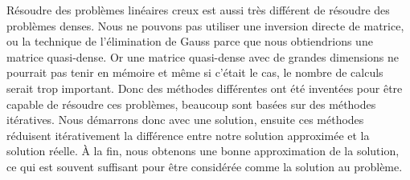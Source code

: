 Résoudre des problèmes linéaires creux est aussi très différent de résoudre des problèmes denses.
%
Nous ne pouvons pas utiliser une inversion directe de matrice, ou la technique de l'élimination de Gauss parce que nous obtiendrions une matrice quasi-dense.
%
Or une matrice quasi-dense avec de grandes dimensions ne pourrait pas tenir en mémoire et même si c'était le cas, le nombre de calculs serait trop important.
%
Donc des méthodes différentes ont été inventées pour être capable de résoudre ces problèmes, beaucoup sont basées sur des méthodes itératives.
%
Nous démarrons donc avec une solution, ensuite ces méthodes réduisent itérativement la différence entre notre solution approximée et la solution réelle.
%
\`{A} la fin, nous obtenons une bonne approximation de la solution, ce qui est souvent suffisant pour être considérée comme la solution au problème.
